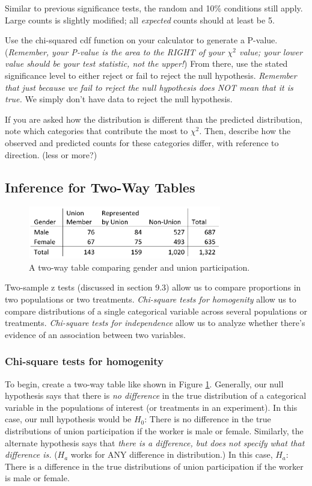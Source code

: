 \documentclass[12pt, a4paper]{article}
\theoremstyle{definition}
\begin{document}
Similar to previous significance tests, the random and 10\% conditions still apply.
Large counts is slightly modified; all \textit{expected} counts should at least be 5.

Use the chi-squared cdf function on your calculator to generate a P-value.
(\textit{Remember, your P-value is the area to the RIGHT of your $\chi^2$ value; your lower value should be your test statistic, not the upper!})
From there, use the stated significance level to either reject or fail to reject the null hypothesis.
\textit{Remember that just because we fail to reject the null hypothesis does NOT mean that it is true.}
We simply don't have data to reject the null hypothesis.

If you are asked how the distribution is different than the predicted distribution, note which categories that contribute the most to $\chi^2$.
Then, describe how the observed and predicted counts for these categories differ, with reference to direction. (less or more?)

\subsection{Inference for Two-Way Tables}
\begin{figure}[t]
    \centering
    \includegraphics[width=0.75\textwidth]{chi-square-homogenity.png}
    \caption{A two-way table comparing gender and union participation.}
    \label{fig:chi-square-homo}
\end{figure}

Two-sample z tests (discussed in section 9.3) allow us to compare proportions in two populations or two treatments.
\textit{Chi-square tests for homogenity} allow us to compare distributions of a single categorical variable across several populations or treatments.
\textit{Chi-square tests for independence} allow us to analyze whether there's evidence of an association between two variables.

\subsubsection{Chi-square tests for homogenity}
To begin, create a two-way table like shown in Figure \ref{fig:chi-square-homo}.
Generally, our null hypothesis says that there is \textit{no difference} in the true distribution of a categorical variable in the populations of interest (or treatments in an experiment).
In this case, our null hypothesis would be $H_0$: There is no difference in the true distributions of union participation if the worker is male or female.
Similarly, the alternate hypothesis says that \textit{there is a difference, but does not specify what that difference is.} ($H_a$ works for ANY difference in distribution.)
In this case, $H_a$: There is a difference in the true distributions of union participation if the worker is male or female.
\end{document}

